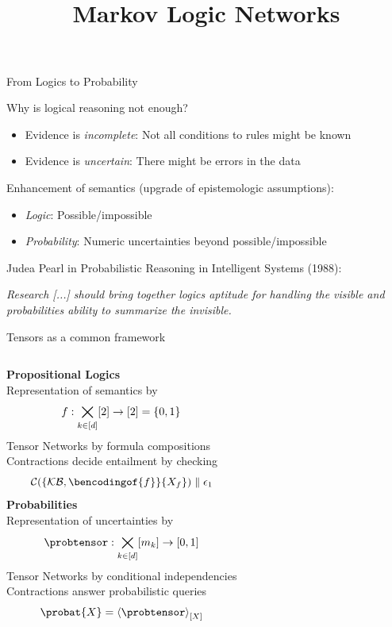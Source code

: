 \documentclass{beamer}
\title[Markov Logic Networks]{
	\coursechapterthree \\
	{\huge Markov Logic Networks}
}
\begin{document}
{\frame[plain]{\titlepage}}


\begin{frame}{From Logics to Probability}

Why is logical reasoning not enough?
\begin{itemize}
	\item Evidence is \emph{incomplete}: Not all conditions to rules might be known
	\item Evidence is \emph{uncertain}: There might be errors in the  data
\end{itemize}

\medskip

Enhancement of semantics (upgrade of epistemologic assumptions):
\begin{itemize}
	\item \emph{Logic}: Possible/impossible 
	\item \emph{Probability}: Numeric uncertainties beyond possible/impossible
\end{itemize}

\medskip 
\medskip

Judea Pearl in Probabilistic Reasoning in Intelligent Systems (1988):
\begin{center}
	\it Research [...] should bring together \emph{logics} aptitude for \emph{handling the visible} and \emph{probabilities} ability to \emph{summarize the invisible}. %
\end{center}

\end{frame}



\begin{frame}{Tensors as a common framework}

\begin{columns}
	 \centering 
	\textbf{Propositional Logics} \\
	\medskip
	Representation of semantics by
		\[ f: \bigtimes_{k\in[d]}[2] \rightarrow [2] = \{0,1\} \]	
	Tensor Networks by formula compositions \\
	\medskip
	Contractions decide entailment by checking
		\[ \mathcal{C}(\{{\kb},\bencodingof{\exformula}\}\{\catvariableof{\exformula}\}) \parallel \onehotmapof{1} \]
	 \centering 
	\textbf{Probabilities} \\
	\medskip
	Representation of uncertainties by
		\[ \probtensor : \facstates \rightarrow [0,1] \]
	Tensor Networks by conditional independencies\\
	\medskip
	Contractions answer probabilistic queries
		\[ \probat{\catvariable} = \contractionof{\probtensor}{\catvariable} \]
\end{columns}

\end{frame}
\end{document}
